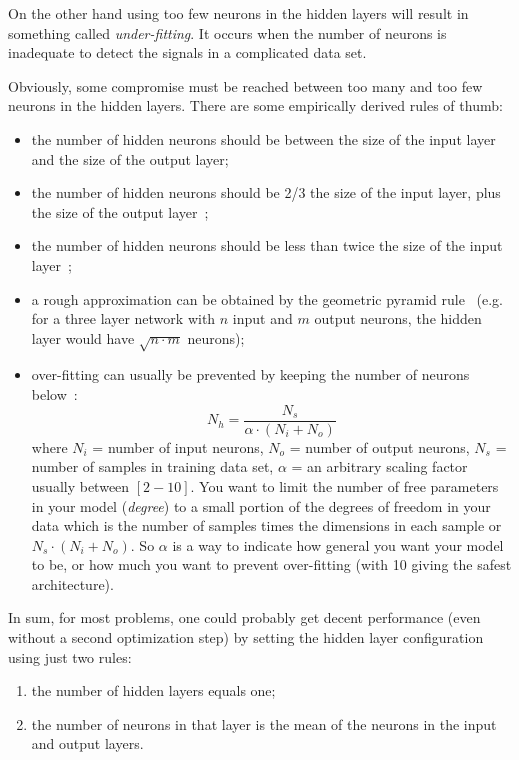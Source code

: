 On the other hand using too few neurons in the hidden layers will result in something called \emph{under-fitting}. It occurs when the number of neurons is inadequate to detect the signals in a complicated data set.

Obviously, some compromise must be reached between too many and too few neurons in the hidden layers. There are some empirically derived rules of thumb:
\begin{itemize}
\item the number of hidden neurons should be between the size of the input layer and the size of the output layer;
\item the number of hidden neurons should be 2/3 the size of the input layer, plus the size of the output layer~\cite{bib:heaton};
\item the number of hidden neurons should be less than twice the size of the input layer~\cite{bib:heaton};
\item a rough approximation can be obtained by the geometric pyramid rule~\cite{bib:master} (e.g. for a three layer network with $n$ input and $m$ output neurons, the hidden layer would have $\sqrt{n\cdot m}$ neurons);
\item over-fitting can usually be prevented by keeping the number of neurons below~\cite{bib:hagan}:
\begin{equation*}
N_h = \frac{N_s}{\alpha\cdot(N_i+N_o)}
\end{equation*}
where $N_i$ = number of input neurons, $N_o$ = number of output neurons, $N_s$ = number of samples in training data set, $\alpha$ = an arbitrary scaling factor usually between $[2-10]$. 
You want to limit the number of free parameters in your model (\emph{degree}) to a small portion of the degrees of freedom in your data which is the number of samples times the  dimensions in each sample or $N_s\cdot(N_i+N_o)$. So $\alpha$ is a way to indicate how general you want your model to be, or how much you want to prevent over-fitting (with 10 giving the safest architecture).
\end{itemize}

In sum, for most problems, one could probably get decent performance (even without a second optimization step) by setting the hidden layer configuration using just two rules:
\begin{enumerate}
\item the number of hidden layers equals one; 
\item the number of neurons in that layer is the mean of the neurons in the input and output layers.
\end{enumerate}


